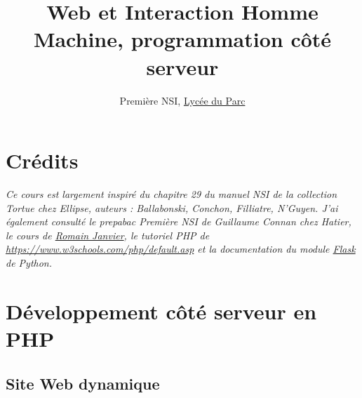 \documentclass[
  11pt,
]{article}
\title{Web et Interaction Homme Machine, programmation côté serveur}
\author{Première NSI, \href{https://frederic-junier.org/}{Lycée du
Parc}}
\date{}
\newcounter{def}
\newcounter{cours}
\begin{document}
\maketitle

\renewcommand*\contentsname{Table des matières}
{
\hypersetup{linkcolor=}
\setcounter{tocdepth}{3}
\tableofcontents
}
\hypertarget{cruxe9dits}{%
\section*{Crédits}\label{cruxe9dits}}

\emph{Ce cours est largement inspiré du chapitre 29 du manuel NSI de la
collection Tortue chez Ellipse, auteurs : Ballabonski, Conchon,
Filliatre, N'Guyen. J'ai également consulté le prepabac Première NSI de
Guillaume Connan chez Hatier, le cours de
\href{http://nsi.janviercommelemois.fr/}{Romain Janvier}, le tutoriel
PHP de \url{https://www.w3schools.com/php/default.asp} et la
documentation du module
\href{https://flask.palletsprojects.com/en/1.1.x/}{Flask} de Python.}

\hypertarget{duxe9veloppement-cuxf4tuxe9-serveur-en-php}{%
\section{Développement côté serveur en
PHP}\label{duxe9veloppement-cuxf4tuxe9-serveur-en-php}}

\hypertarget{site-web-dynamique}{%
\subsection{Site Web dynamique}\label{site-web-dynamique}}
\end{document}
